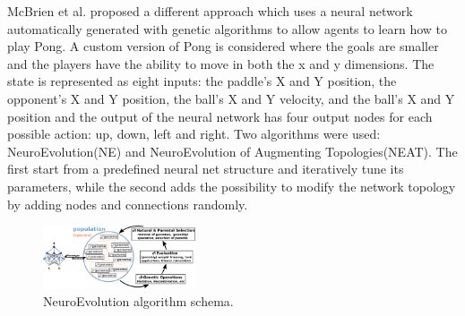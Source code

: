 McBrien et al. \cite{mcbrien2020learning} proposed a different approach which uses a neural network automatically generated with genetic algorithms to allow agents to learn how to play Pong.
%
A custom version of Pong is considered where the goals are smaller and the players have the ability to move in both the x and y dimensions.
%
The state is represented as eight inputs: the paddle's X and Y position, the opponent's X and Y position, the ball's X and Y velocity,
and the ball's X and Y position and the output of the neural network has four output nodes for each possible action: up, down, left and right.
%
Two algorithms were used: NeuroEvolution(NE) and NeuroEvolution of Augmenting Topologies(NEAT).
The first start from a predefined neural net structure and iteratively tune its parameters, while the second adds the possibility to modify the network topology by adding nodes and connections randomly.

\begin{figure}[ht]
  \centering
  \includegraphics[width=0.4\textwidth]{images/neuroevolution.png}
  \caption{NeuroEvolution algorithm schema.}
  \label{fig:ne}
\end{figure}
